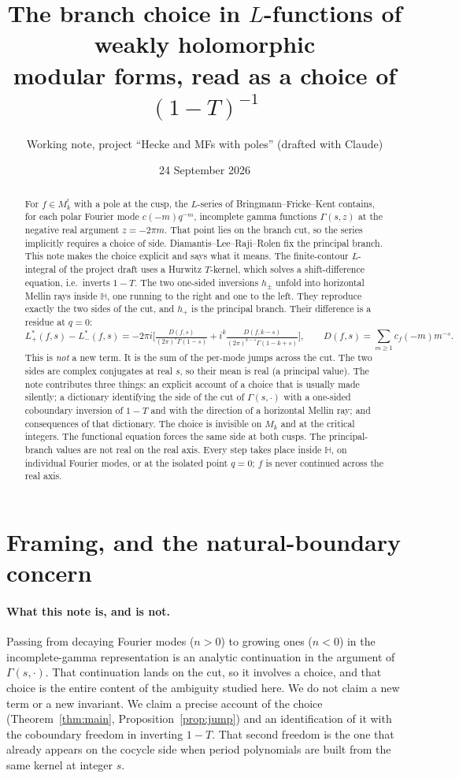 \documentclass[11pt]{article}
\title{The branch choice in $L$-functions of weakly holomorphic\\ modular forms,
read as a choice of $(1-T)^{-1}$}
\author{Working note, project ``Hecke and MFs with poles'' (drafted with Claude)}
\date{24 September 2026}
\theoremstyle{definition}
\theoremstyle{remark}
\newcommand{\HH}{\mathbb{H}}
\begin{document}
\maketitle

\begin{abstract}
For $f\in M^!_k$ with a pole at the cusp, the $L$-series of Bringmann--Fricke--Kent contains,
for each polar Fourier mode $c(-m)q^{-m}$, incomplete gamma functions $\Gamma(s,z)$ at the
negative real argument $z=-2\pi m$. That point lies on the branch cut, so the series
implicitly requires a choice of side. Diamantis--Lee--Raji--Rolen fix the principal
branch. This note makes the choice explicit and says what it means. The finite-contour
$L$-integral of the project draft uses a Hurwitz $T$-kernel, which solves a shift-difference
equation, i.e.\ inverts $1-T$. The two one-sided inversions $h_\pm$ unfold into horizontal
Mellin rays inside $\HH$, one running to the right and one to the left. They reproduce
exactly the two sides of the cut, and $h_+$ is the principal branch. Their difference is a
residue at $q=0$:
\[
L^*_+(f,s)-L^*_-(f,s)
=-2\pi i\Big[\tfrac{D(f,s)}{(2\pi)^s\Gamma(1-s)}
+i^k\tfrac{D(f,k-s)}{(2\pi)^{k-s}\Gamma(1-k+s)}\Big],
\qquad D(f,s)=\sum_{m\ge1}c_f(-m)m^{-s}.
\]
This is \emph{not} a new term. It is the sum of the per-mode jumps across the cut. The two
sides are complex conjugates at real $s$, so their mean is real (a principal value). The
note contributes three things: an explicit account of a choice that is usually made
silently; a dictionary identifying the side of the cut of $\Gamma(s,\cdot)$ with a one-sided
coboundary inversion of $1-T$ and with the direction of a horizontal Mellin ray; and
consequences of that dictionary. The choice is invisible on $M_k$ and at the critical
integers. The functional equation forces the same side at both cusps. The
principal-branch values are not real on the real axis. Every step takes place inside $\HH$,
on individual Fourier modes, or at the isolated point $q=0$; $f$ is never continued across
the real axis.
\end{abstract}

\section{Framing, and the natural-boundary concern}

\paragraph{What this note is, and is not.}
Passing from decaying Fourier modes ($n>0$) to growing ones ($n<0$) in the incomplete-gamma
representation is an analytic continuation in the argument of $\Gamma(s,\cdot)$. That
continuation lands on the cut, so it involves a choice, and that choice is the entire
content of the ambiguity studied here. We do not claim a new term or a new invariant. We
claim a precise account of the choice (Theorem~\ref{thm:main}, Proposition~\ref{prop:jump}) and an
identification of it with the coboundary freedom in inverting $1-T$. That second
freedom is the one that already appears on the cocycle side when period polynomials are
built from the same kernel at integer $s$.
\end{document}
